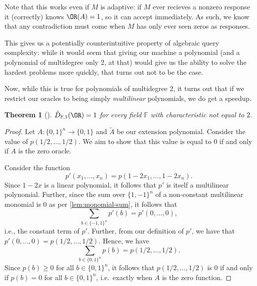 \documentclass[english,12pt]{reedthesis}
\theoremstyle{plain}
\newtheorem{thm}{Theorem}[section]
\theoremstyle{definition}
\theoremstyle{remark}
\begin{document}
Note that this works even if $M$ is adaptive: if $M$ ever recieves a nonzero
response it (correctly) knows $\OR(A) = 1$, so it can accept immediately. As
such, we know that any contradiction must come when $M$ has only ever seen zeros
as responses.

This gives us a potentially counterintuitive property of algebraic query
complexity: while it would seem that giving our machine a polynomial (and a
polynomial of multidegree only 2, at that) would give us the ability to solve
the hardest problems more quickly, that turns out not to be the case.

Now, while this is true for polynomials of multidegree 2, it turns out that if
we restrict our oracles to being simply \emph{multilinear} polynomials, we do
get a speedup.

\begin{thm}[{\cite[Thm. 3]{JKRS09}}]\label{thm:or-multilinear}
  $\tilde{D}_{\mathbb{F},1}(\OR) = 1$ for every field $\mathbb{F}$ with
  characteristic not equal to $2$.
\end{thm}

\begin{proof}
  Let $A\colon \{0, 1\}^{n} \rightarrow \{0, 1\}$ and $\tilde{A}$ be our extension
  polynomial. Consider the value of $p(1/2, \ldots, 1/2)$. We aim to show that this
  value is equal to $0$ if and only if $A$ is the zero oracle.

  Consider the function
  \begin{equation}
    p'(x_{1}, \ldots, x_{n}) = p(1 - 2x_{1}, \ldots, 1 - 2x_{n}).
  \end{equation}
  Since $1 - 2x$ is a linear polynomial, it follows that $p'$ is itself a
  multilinear polynomial. Further, since the sum over $\{1, -1\}^{n}$ of a
  non-constant multilinear monomial is 0 as per \cref{lem:monomial-sum}, it
  follows that
  \begin{equation}
    \sum_{b \in \{-1, 1\}^{n}}p'(b) = p'(0, \ldots, 0),
  \end{equation}
  i.e., the constant term of $p'$. Further, from our definition of $p'$, we have
  that $p'(0, \ldots, 0) = p(1/2, \ldots, 1/2)$. Hence, we have
  \begin{equation}
    \sum_{b \in \{0, 1\}^{n}}p(b) = p(1/2, \ldots, 1/2).
  \end{equation}
  Since $p(b) \ge 0$ for all $b \in \{0, 1\}^{n}$, it follows that $p(1/2, \ldots, 1/2)$
  is 0 if and only if $p(b) = 0$ for all $b \in \{0, 1\}^{n}$, i.e.\ exactly when
  $A$ is the zero function.
\end{proof}
\end{document}
